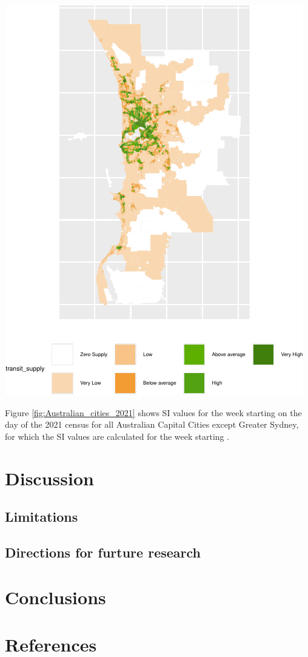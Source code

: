 \documentclass[preprint, 3p,
authoryear]{elsarticle} %
\begin{document}
\includegraphics{Leveraging_GTFS_to_assess_transit_supply_Transport_Geography_files/figure-latex/Australian_cities_2021-5.pdf}

Figure \ref{fig:Australian_cities_2021} shows SI values for the week
starting on the day of the 2021 census for all Australian Capital Cities
except Greater Sydney, for which the SI values are calculated for the
week starting .

\section{Discussion}\label{discussion}

\subsection{Limitations}\label{limitations}

\subsection{Directions for furture
research}\label{directions-for-furture-research}

\section{Conclusions}\label{conclusions}

\section*{References}\label{references}

\renewcommand\refname{Appendix A - GCCSA maps by SA1}

\end{document}
